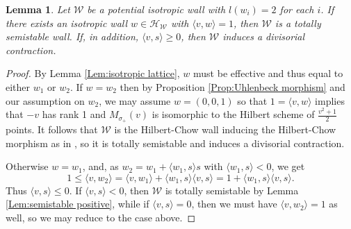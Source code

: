 \documentclass[leqno,11pt]{amsart}
\newtheorem{Lem}[Thm]{Lemma}
\theoremstyle{definition}
\def\HH{\ensuremath{\mathcal H}}
\def\WW{\ensuremath{\mathcal W}}
\begin{document}
\begin{Lem}
Let $\WW$ be a potential isotropic wall with $l(w_i)=2$ for each $i$.  If there exists an isotropic wall $w\in\HH_{\WW}$ with $\langle v,w\rangle=1$, then $\WW$ is a totally semistable wall.  If, in addition, $\langle v,s\rangle\geq 0$, then $\WW$ induces a divisorial contraction.
\end{Lem}
\begin{proof}
By Lemma \ref{Lem:isotropic lattice}, $w$ must be effective and thus equal to either $w_1$ or $w_2$.  If $w=w_2$ then by Proposition \ref{Prop:Uhlenbeck morphism} and our assumption on $w_2$, we may assume $w=(0,0,1)$ so that $1=\langle v,w\rangle$ implies that $-v$ has rank 1 and $M_{\sigma_+}(v)$ is isomorphic to the Hilbert scheme of $\frac{v^2+1}{2}$ points.  It follows that $\WW$ is the Hilbert-Chow wall inducing the Hilbert-Chow morphism as in \cite[Proposition 13.1]{Nue14b}, so it is totally semistable and induces a divisorial contraction.

Otherwise $w=w_1$, and, as $w_2=w_1+\langle w_1,s\rangle s$ with $\langle w_1,s\rangle<0$, we get $$1\leq\langle v,w_2\rangle=\langle v,w_1\rangle+\langle w_1,s\rangle\langle v,s\rangle=1+\langle w_1,s\rangle\langle v,s\rangle.$$ Thus $\langle v,s\rangle\leq 0$.  If $\langle v,s\rangle<0$, then $\WW$ is totally semistable by Lemma \ref{Lem:semistable positive}, while if $\langle v,s\rangle=0$, then we must have $\langle v,w_2\rangle=1$ as well, so we may reduce to the case above.
\end{proof}
\end{document}
